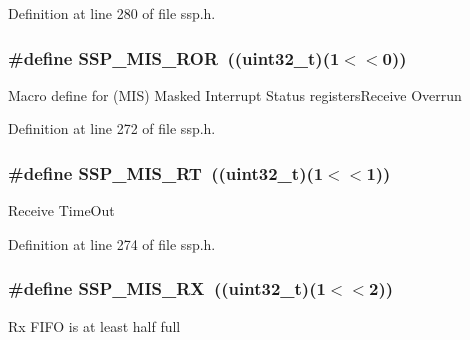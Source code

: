 Definition at line 280 of file ssp.\+h.

\subsubsection[{\texorpdfstring{S\+S\+P\+\_\+\+M\+I\+S\+\_\+\+R\+OR}{SSP_MIS_ROR}}]{\setlength{\rightskip}{0pt plus 5cm}\#define S\+S\+P\+\_\+\+M\+I\+S\+\_\+\+R\+OR~(({\bf uint32\+\_\+t})(1$<$$<$0))}\hypertarget{group___s_s_p___private___macros_ga5ab078b780d3ab049afbc4bf1d548164}{}\label{group___s_s_p___private___macros_ga5ab078b780d3ab049afbc4bf1d548164}
Macro define for (M\+IS) Masked Interrupt Status registers\+Receive Overrun 

Definition at line 272 of file ssp.\+h.

\subsubsection[{\texorpdfstring{S\+S\+P\+\_\+\+M\+I\+S\+\_\+\+RT}{SSP_MIS_RT}}]{\setlength{\rightskip}{0pt plus 5cm}\#define S\+S\+P\+\_\+\+M\+I\+S\+\_\+\+RT~(({\bf uint32\+\_\+t})(1$<$$<$1))}\hypertarget{group___s_s_p___private___macros_gac656007811dd29f2448a6a534aee04a3}{}\label{group___s_s_p___private___macros_gac656007811dd29f2448a6a534aee04a3}
Receive Time\+Out 

Definition at line 274 of file ssp.\+h.

\subsubsection[{\texorpdfstring{S\+S\+P\+\_\+\+M\+I\+S\+\_\+\+RX}{SSP_MIS_RX}}]{\setlength{\rightskip}{0pt plus 5cm}\#define S\+S\+P\+\_\+\+M\+I\+S\+\_\+\+RX~(({\bf uint32\+\_\+t})(1$<$$<$2))}\hypertarget{group___s_s_p___private___macros_gaae1efd94a8b66679f1793a3c5458a777}{}\label{group___s_s_p___private___macros_gaae1efd94a8b66679f1793a3c5458a777}
Rx F\+I\+FO is at least half full 

